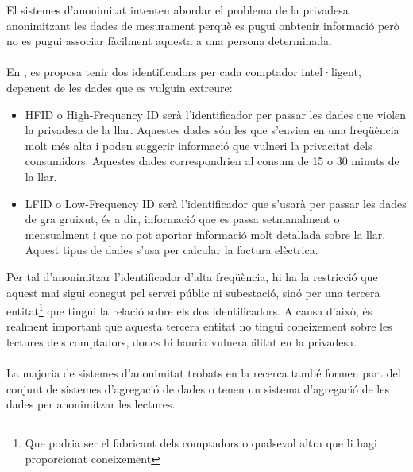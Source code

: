 
El sistemes d'anonimitat intenten abordar el problema de la privadesa anonimitzant les dades de mesurament perquè es pugui onbtenir informació però no es pugui associar fàcilment aquesta a una persona determinada.
\\\\
En \cite{anonimity}, es proposa tenir dos identificadors per cada comptador intel·ligent, depenent de les dades que es vulguin extreure:
\begin{itemize}
	\item HFID o High-Frequency ID serà l'identificador per passar les dades que violen la privadesa de la llar. Aquestes dades són les que s'envien en una freqüència molt més alta i poden suggerir informació que vulneri la privacitat dels consumidors. Aquestes dades correspondrien al consum de 15 o 30 minuts de la llar.
	\item LFID o Low-Frequency ID serà l'identificador que s'usarà per passar les dades de gra gruixut, és a dir, informació que es passa setmanalment o mensualment i que no pot aportar informació molt detallada sobre la llar. Aquest tipus de dades s'usa per calcular la factura elèctrica.
\end{itemize}
Per tal d'anonimitzar l'identificador d'alta freqüència, hi ha la restricció que aquest mai sigui conegut pel servei públic ni subestació, sinó per una tercera entitat\footnote{Que podria ser el fabricant dels comptadors o qualsevol altra que li hagi proporcionat coneixement} que tingui la relació sobre els dos identificadors. A causa d'això, és realment important que aquesta tercera entitat no tingui coneixement sobre les lectures dels comptadors, doncs hi hauria vulnerabilitat en la privadesa.
\\
\\
La majoria de sistemes d'anonimitat trobats en la recerca també formen part del conjunt de sistemes d'agregació de dades o tenen un sistema d'agregació de les dades per anonimitzar les lectures.
